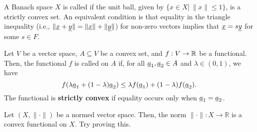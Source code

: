 \begin{definition}
A Banach space $X$ is called  if the unit ball,  given by $\{ x\in X | \, \| x \| \leq 1 \}$, is a strictly convex set.
An equivalent condition is that equality in the triangle inequality (i.e., $\| \underline{x} + \underline{y} \| = \| \underline{x} \| + \| \underline{y} \|$) for non-zero vectors implies that $ \underline{x} = s \underline{y} $ for some $s\in F$.
\end{definition}

\begin{definition}
Let $V$ be a vector space, $A \subseteq V$ be a convex set, and $f: V \rightarrow \mathbb{R}$ be a functional.
Then, the functional $f$ is called  on $A$ if, for all $\underline{a}_1,\underline{a}_2 \in A$ and $\lambda\in(0,1)$, we have
\[ f( \lambda \underline{a}_1 + (1-\lambda) \underline{a}_2 ) \leq \lambda f( \underline{a}_1 ) + (1-\lambda) f ( \underline{a}_2 ). \]
The functional is \textbf{strictly convex} if equality occurs only when $\underline{a}_1 = \underline{a}_2$.
\end{definition}

\begin{example}
Let $(X,\|\cdot\|)$ be a normed vector space.
Then, the norm $\| \cdot \| : X \rightarrow \mathbb{R}$ is a convex functional on $X$.
Try proving this.
\end{example}

